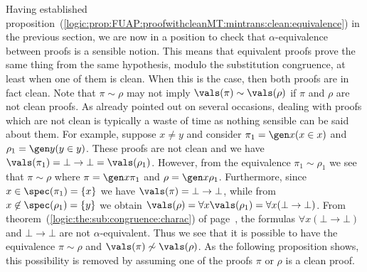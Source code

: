 Having established
proposition~(\ref{logic:prop:FUAP:proofwithcleanMT:mintrans:clean:equivalence})
in the previous section, we are now in a position to check that
$\alpha$-equivalence between proofs is a sensible notion. This means
that equivalent proofs prove the same thing from the same
hypothesis, modulo the substitution congruence, at least when one of
them is clean. When this is the case, then both proofs are in fact
clean. Note that $\pi\sim\rho$ may not imply
$\vals(\pi)\sim\vals(\rho)$ if $\pi$ and $\rho$ are not clean
proofs. As already pointed out on several occasions, dealing with
proofs which are not clean is typically a waste of time as nothing
sensible can be said about them. For example, suppose $x\neq y$ and
consider $\pi_{1}=\gen x(x\in x)$ and $\rho_{1}=\gen y(y\in y)$.
These proofs are not clean and we have
$\vals(\pi_{1})=\bot\to\bot=\vals(\rho_{1})$. However, from the
equivalence $\pi_{1}\sim\rho_{1}$ we see that $\pi\sim\rho$ where
$\pi=\gen x\pi_{1}$ and $\rho=\gen x\rho_{1}$. Furthermore, since
$x\in\spec(\pi_{1})=\{x\}$ we have $\vals(\pi)=\bot\to\bot$, while
from $x\not\in\spec(\rho_{1})=\{y\}$ we obtain $\vals(\rho)=\forall
x\vals(\rho_{1})=\forall x(\bot\to\bot)$. From
theorem~(\ref{logic:the:sub:congruence:charac}) of
page~\pageref{logic:the:sub:congruence:charac}, the formulas
$\forall x(\bot\to\bot)$ and $\bot\to\bot$ are not
$\alpha$-equivalent. Thus we see that it is possible to have the
equivalence $\pi\sim\rho$ and $\vals(\pi)\not\sim\vals(\rho)$. As
the following proposition shows, this possibility is removed by
assuming one of the proofs $\pi$ or $\rho$ is a clean proof.

